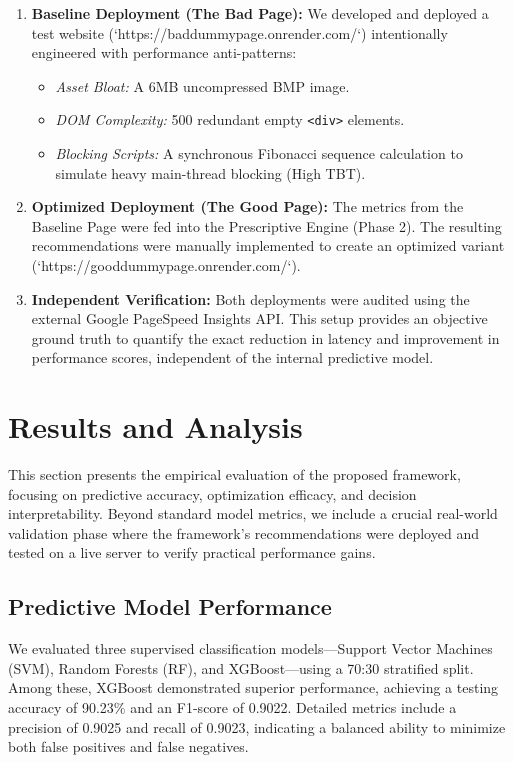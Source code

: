 \documentclass[sn-nature]{sn-jnl}
\begin{document}
\begin{enumerate}
    \item \textbf{Baseline Deployment (The Bad Page):} We developed and deployed a test website (`https://baddummypage.onrender.com/`) intentionally engineered with performance anti-patterns:
    \begin{itemize}
        \item \textit{Asset Bloat:} A 6MB uncompressed BMP image.
        \item \textit{DOM Complexity:} 500 redundant empty \texttt{<div>} elements.
        \item \textit{Blocking Scripts:} A synchronous Fibonacci sequence calculation to simulate heavy main-thread blocking (High TBT).
    \end{itemize}
    
    \item \textbf{Optimized Deployment (The Good Page):} The metrics from the Baseline Page were fed into the Prescriptive Engine (Phase 2). The resulting recommendations were manually implemented to create an optimized variant (`https://gooddummypage.onrender.com/`).
    
    \item \textbf{Independent Verification:} Both deployments were audited using the external Google PageSpeed Insights API. This setup provides an objective ground truth to quantify the exact reduction in latency and improvement in performance scores, independent of the internal predictive model.
\end{enumerate}


\section{Results and Analysis}\label{sec6}

This section presents the empirical evaluation of the proposed framework, focusing on predictive accuracy, optimization efficacy, and decision interpretability. Beyond standard model metrics, we include a crucial real-world validation phase where the framework's recommendations were deployed and tested on a live server to verify practical performance gains.

\subsection{Predictive Model Performance}

We evaluated three supervised classification models—Support Vector Machines (SVM), Random Forests (RF), and XGBoost—using a 70:30 stratified split. Among these, XGBoost demonstrated superior performance, achieving a testing accuracy of 90.23\% and an F1-score of 0.9022. Detailed metrics include a precision of 0.9025 and recall of 0.9023, indicating a balanced ability to minimize both false positives and false negatives.
\end{document}
